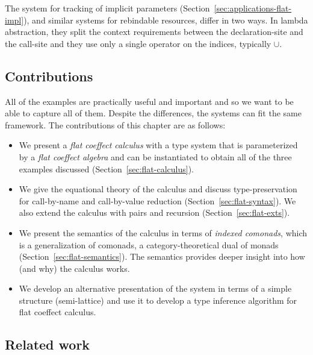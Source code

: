The system for tracking of implicit parameters (Section~\ref{sec:applications-flat-impl}), and
similar systems for rebindable resources, differ in two ways. In lambda abstraction, they split
the context requirements between the declaration-site and the call-site and they use only a single
operator on the indices, typically $\cup$.


\subsection{Contributions}

All of the examples are practically useful and important and so we want to be able to capture all
of them. Despite the differences, the systems can fit the same framework. The contributions of this
chapter are as follows:

\begin{itemize}
\item We present a \emph{flat coeffect calculus} with a type system that is parameterized by a 
  \emph{flat coeffect algebra} and can be instantiated to obtain all of the three examples
  discussed (Section~\ref{sec:flat-calculus}).
  
\item We give the equational theory of the calculus and discuss type-preservation for call-by-name
  and call-by-value reduction (Section~\ref{sec:flat-syntax}). We also extend the calculus
  with pairs and recursion (Section~\ref{sec:flat-exts}).
  
\item We present the semantics of the calculus in terms of \emph{indexed comonads}, which is a
  generalization of comonads, a category-theoretical dual of monads (Section~\ref{sec:flat-semantics}).
  The semantics provides deeper insight into how (and why) the calculus works.

\item We develop an alternative presentation of the system in terms of a simple structure 
  (semi-lattice) and use it to develop a type inference algorithm for flat coeffect calculus.
\end{itemize}


\subsection{Related work}

